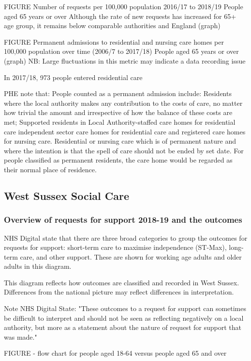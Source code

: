 FIGURE Number of requests per 100,000 population 2016/17 to 2018/19 People aged 65 years or over Although the rate of new requests has increased for 65+ age group, it remains below comparable authorities and England (graph)

FIGURE Permanent admissions to residential and nursing care homes per 100,000 population over time (2006/7 to 2017/18) People aged 65 years or over (graph) NB: Large fluctuations in this metric may indicate a data recording issue

In 2017/18, 973 people entered residential care

\footnotesize
PHE note that: People counted as a permanent admission include: Residents where the local authority makes any contribution to the costs of care, no matter how trivial the amount and irrespective of how the balance of these costs are met; Supported residents in Local Authority-staffed care homes for residential care independent sector care homes for residential care and registered care homes for nursing care. Residential or nursing care which is of permanent nature and where the intention is that the spell of care should not be ended by set date. For people classified as permanent residents, the care home would be regarded as their normal place of residence.
\normalsize


\subsection{West Sussex Social Care}
\subsubsection{Overview of requests for support 2018-19 and the outcomes}
NHS Digital state that there are three broad categories to group the outcomes for requests for support: short-term care to maximise independence (ST-Max), long-term care, and other support. These are shown for working age adults and older adults in this diagram.

This diagram reflects how outcomes are classified and recorded in West Sussex. Differences from the national picture may reflect differences in interpretation.

Note NHS Digital State: "These outcomes to a request for support can sometimes be difficult to interpret and should not be seen as reflecting negatively on a local authority, but more as a statement about the nature of request for support that was made."

FIGURE - flow chart for people aged 18-64 versus people aged 65 and over

